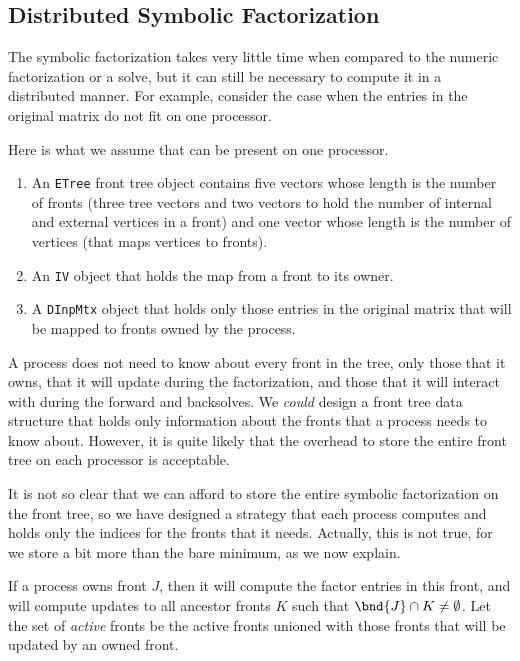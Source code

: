 \par
\subsection{Distributed Symbolic Factorization}
\label{subsection:DChvMtx:symbolic-factorization}
\par
The symbolic factorization takes very little time when compared to the
numeric factorization or a solve, but it can still be necessary to
compute it in a distributed manner.
For example, consider the case when the entries in the
original matrix do not fit on one processor.
\par
Here is what we assume that can be present on one processor.
\begin{enumerate}
\item 
An {\tt ETree} front tree object 
contains five vectors whose length is the number of fronts
(three tree vectors and two vectors to hold the number of internal
and external vertices in a front)
and one vector whose length is the number of vertices
(that maps vertices to fronts).
\item
An {\tt IV} object that holds the map from a front to its owner.
\item
A {\tt DInpMtx} object that holds only those entries in the
original matrix that will be mapped to fronts owned by the process.
\end{enumerate}
\par
A process does not need to know about every front in the tree,
only those that it owns, that it will update during the
factorization, and those that it will interact with during the
forward and backsolves.
We {\it could} design a front tree data structure that holds 
only information about the fronts that a process needs to know about.
However, it is quite likely that the overhead to store the entire
front tree on each processor is acceptable.
\par
It is not so clear that we can afford to store the entire symbolic
factorization on the front tree, so we have designed a strategy
that each process computes and holds only the indices for the
fronts that it needs.
Actually, this is not true, for we store a bit more than the
bare minimum, as we now explain.
\par
If a process owns front $J$, then it will compute the factor
entries in this front, and will compute updates to all ancestor
fronts $K$ such that $\bnd{J} \cap K \ne \emptyset$.
Let the set of {\it active} fronts be the active fronts 
unioned with those fronts that will be updated by an owned front.
